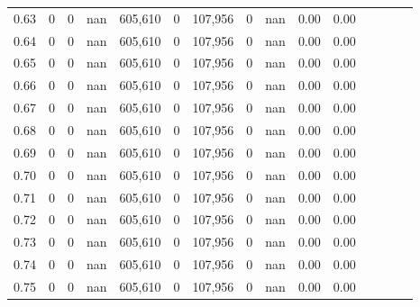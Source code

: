 \begin{tabular}{rrrcrrrrrrrrrrr}
0.63 &       0 &      0 &                                        nan &  605,610 &        0 &  107,956 &        0 &   nan &  0.00 &                         0.00 \\
0.64 &       0 &      0 &                                        nan &  605,610 &        0 &  107,956 &        0 &   nan &  0.00 &                         0.00 \\
0.65 &       0 &      0 &                                        nan &  605,610 &        0 &  107,956 &        0 &   nan &  0.00 &                         0.00 \\
0.66 &       0 &      0 &                                        nan &  605,610 &        0 &  107,956 &        0 &   nan &  0.00 &                         0.00 \\
0.67 &       0 &      0 &                                        nan &  605,610 &        0 &  107,956 &        0 &   nan &  0.00 &                         0.00 \\
0.68 &       0 &      0 &                                        nan &  605,610 &        0 &  107,956 &        0 &   nan &  0.00 &                         0.00 \\
0.69 &       0 &      0 &                                        nan &  605,610 &        0 &  107,956 &        0 &   nan &  0.00 &                         0.00 \\
0.70 &       0 &      0 &                                        nan &  605,610 &        0 &  107,956 &        0 &   nan &  0.00 &                         0.00 \\
0.71 &       0 &      0 &                                        nan &  605,610 &        0 &  107,956 &        0 &   nan &  0.00 &                         0.00 \\
0.72 &       0 &      0 &                                        nan &  605,610 &        0 &  107,956 &        0 &   nan &  0.00 &                         0.00 \\
0.73 &       0 &      0 &                                        nan &  605,610 &        0 &  107,956 &        0 &   nan &  0.00 &                         0.00 \\
0.74 &       0 &      0 &                                        nan &  605,610 &        0 &  107,956 &        0 &   nan &  0.00 &                         0.00 \\
0.75 &       0 &      0 &                                        nan &  605,610 &        0 &  107,956 &        0 &   nan &  0.00 &                         0.00 \\

\end{tabular}
